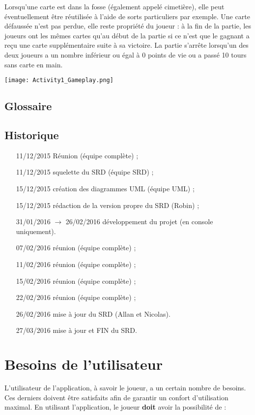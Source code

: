 \documentclass[12pt]{article}
\begin{document}
			Lorsqu'une carte est dans la \gls{fosse} (également appelé cimetière), elle peut éventuellement être réutilisée à l'aide de \glspl{sort} particuliers par exemple. Une carte défaussée n'est pas perdue, elle reste propriété du joueur : à la fin de la partie, les joueurs ont les mêmes cartes qu'au début de la partie si ce n'est que le gagnant a reçu une carte supplémentaire suite à sa victoire. La partie s'arrête lorsqu'un des deux joueurs a un nombre inférieur ou égal à 0 points de vie ou a passé 10 tours sans carte en main.

			\begin{center}\texttt{[image: Activity1\_Gameplay.png]}\end{center}

	\subsection{Glossaire}  %
		\printglossary[type=glossary, style=noIndex, title=]

	\subsection{Historique}
		\begin{itemize}
			\item[11/12/2015] Réunion (équipe complète) ;
			\item[11/12/2015] squelette du SRD (équipe SRD) ;
			\item[15/12/2015] création des diagrammes UML (équipe UML) ;
			\item[15/12/2015] rédaction de la version propre du SRD (Robin) ;
			\item[31/01/2016 $\rightarrow$ 26/02/2016] développement du projet (en console uniquement).
			\item[07/02/2016] réunion (équipe complète) ;
			\item[11/02/2016] réunion (équipe complète) ;
			\item[15/02/2016] réunion (équipe complète) ;
			\item[22/02/2016] réunion (équipe complète) ;
			\item[26/02/2016] mise à jour du SRD (Allan et Nicolas).
			\item[27/03/2016] mise à jour et FIN du SRD.
		\end{itemize}

\newpage

\section{Besoins de l'utilisateur}
	L'utilisateur de l'application, à savoir le joueur, a un certain nombre de besoins. Ces derniers doivent être satisfaits afin de garantir un confort d'utilisation
	maximal. En utilisant l'application, le joueur \textbf{doit} avoir la possibilité de :
\end{document}
